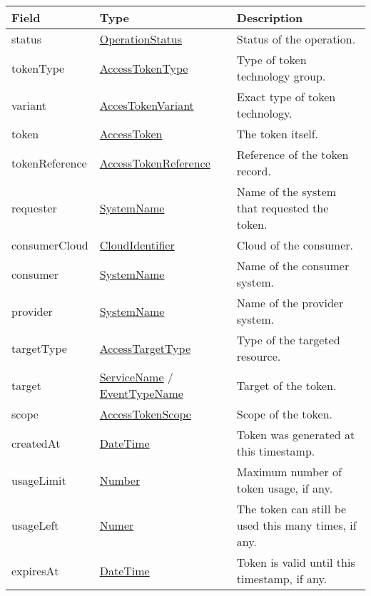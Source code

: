 \documentclass[a4paper]{arrowhead}
\newcommand{\pref}[1]{{\textcolor{ArrowheadGrey}{\hyperref[sec:model:primitives:#1]{#1}}}}
\begin{document}

\begin{table}[ht!]
\begin{tabularx}{\textwidth}{| p{4.25cm} | p{4.5cm} | X |} \hline
\rowcolor{gray!33} Field & Type & Description \\ \hline
status & \pref{OperationStatus} & Status of the operation. \\ \hline
tokenType & \pref{AccessTokenType} & Type of token technology group. \\ \hline
variant & \pref{AccesTokenVariant} & Exact type of token technology. \\ \hline
token & \pref{AccessToken} & The token itself. \\ \hline
tokenReference & \pref{AccessTokenReference} & Reference of the token record. \\ \hline
requester & \pref{SystemName} & Name of the system that requested the token. \\ \hline
consumerCloud & \pref{CloudIdentifier} & Cloud of the consumer. \\ \hline
consumer & \pref{SystemName} & Name of the consumer system. \\ \hline
provider & \pref{SystemName} & Name of the provider system. \\ \hline
targetType & \pref{AccessTargetType} & Type of the targeted resource. \\ \hline
target & \pref{ServiceName} / \pref{EventTypeName} & Target of the token. \\ \hline
scope & \hyperref[sec:model:AccessTokenScope]{AccessTokenScope} & Scope of the token. \\ \hline
createdAt & \pref{DateTime} & Token was generated at this timestamp. \\ \hline
usageLimit & \pref{Number} & Maximum number of token usage, if any. \\ \hline
usageLeft & \pref{Numer} & The token can still be used this many times, if any. \\ \hline
expiresAt & \pref{DateTime} & Token is valid until this timestamp, if any. \\ \hline
\end{tabularx}
\end{table}

\clearpage

\end{document}
